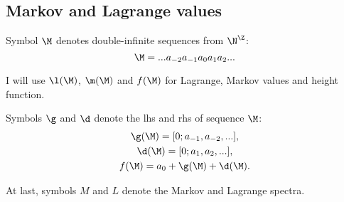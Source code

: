 \subsection{Markov and Lagrange values}

Symbol $\M$ denotes double-infinite sequences from $\N^\Z$:
\begin{equation*}
	\M = ...a_{-2}a_{-1}a_0a_1a_2...
\end{equation*}

I will use $\l(\M)$, $\m(\M)$ and $f(\M)$ for Lagrange, Markov values and height function.

Symbols $\g$ and $\d$ denote the lhs and rhs of sequence $\M$:
\begin{gather*}
	\g(\M) = [0; a_{-1}, a_{-2}, ...], \\
	\d(\M) = [0; a_1, a_2, ...], \\
	f(\M) = a_0 + \g(\M) + \d(\M).
\end{gather*}

At last, symbols $M$ and $L$ denote the Markov and Lagrange spectra.
